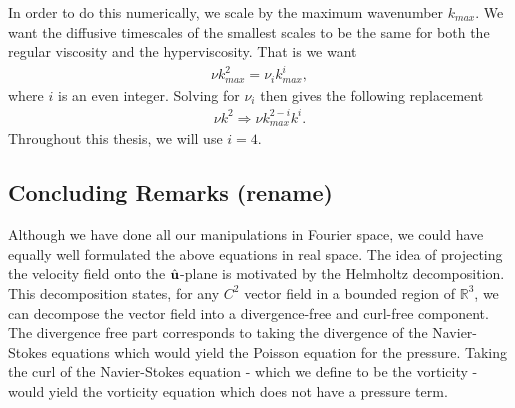 In order to do this numerically, we scale by the maximum wavenumber $k_{max}$. We want the diffusive timescales of the smallest scales to be the same for both the regular viscosity and the hyperviscosity. That is we want
\begin{align}
\nu k_{max}^{2} = \nu_{i}k_{max}^{i},
\end{align}
where $i$ is an even integer. Solving for $\nu_{i}$ then gives the following replacement
\begin{align}
\nu k^{2} \Rightarrow \nu k_{max}^{2-i}k^{i}.
\end{align}
Throughout this thesis, we will use $i=4$. 

\subsection{Concluding Remarks (rename)}
Although we have done all our manipulations in Fourier space, we could have equally well formulated the above equations in real space. The idea of projecting the velocity field onto the $\hat{\textbf{u}}$-plane is motivated by the Helmholtz decomposition. This decomposition states, for any $C^{2}$ vector field in a bounded region of $\mathbb{R}^{3}$, we can decompose the vector field into a divergence-free and curl-free component. The divergence free part corresponds to taking the divergence of the Navier-Stokes equations which would yield the Poisson equation for the pressure. Taking the curl of the Navier-Stokes equation - which we define to be the vorticity - would yield the vorticity equation which does not have a pressure term.
